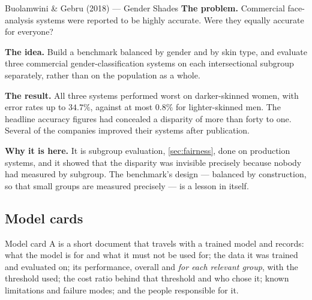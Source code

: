 \begin{researchspotlight}{Buolamwini \& Gebru (2018) --- Gender Shades}
\textbf{The problem.} Commercial face-analysis systems were reported to be highly
accurate. Were they equally accurate for everyone?

\textbf{The idea.} Build a benchmark balanced by gender and by skin type, and
evaluate three commercial gender-classification systems on each intersectional
subgroup separately, rather than on the population as a whole.

\textbf{The result.} All three systems performed worst on darker-skinned women,
with error rates up to $34.7\%$, against at most $0.8\%$ for lighter-skinned
men. The headline accuracy figures had concealed a disparity of more than forty
to one. Several of the companies improved their systems after publication.

\textbf{Why it is here.} It is subgroup evaluation, \cref{sec:fairness}, done on
production systems, and it showed that the disparity was invisible precisely
because nobody had measured by subgroup. The benchmark's design --- balanced by
construction, so that small groups are measured precisely --- is a lesson in
itself.
\parencite{buolamwini2018}
\end{researchspotlight}

\subsection{Model cards}

\begin{defbox}{Model card}
A  is a short document that travels with a trained model and
records: what the model is for and what it must not be used for; the data it was
trained and evaluated on; its performance, overall and \emph{for each relevant
group}, with the threshold used; the cost ratio behind that threshold and who
chose it; known limitations and failure modes; and the people responsible for
it.
\end{defbox}

